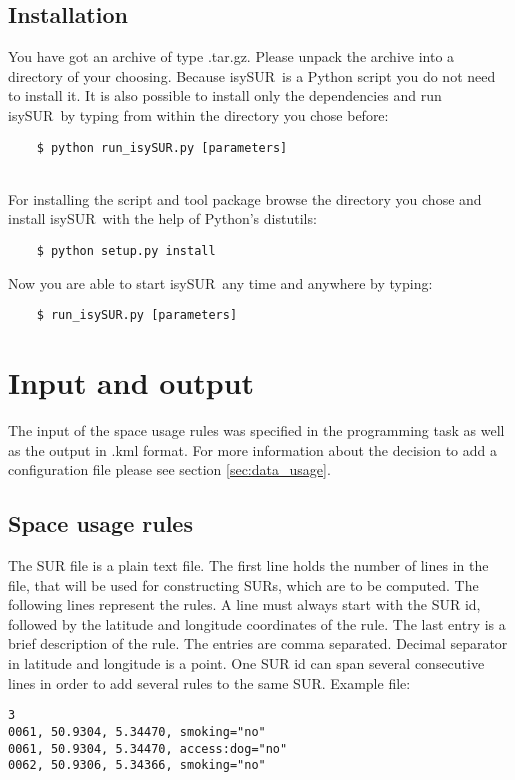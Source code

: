 \documentclass[11pt,fleqn]{book} %
\newcommand{\ProjectTitle}{isySUR}
\newcommand{\pt}{\ProjectTitle}
\begin{document}
\subsection{Installation}
You have got an archive of type .tar.gz. Please unpack the archive into a directory of your choosing. Because \pt\ is a Python script you do not need to install it. It is also possible to install only the dependencies and run \pt\ by typing from within the directory you chose before:
\begin{verbatim}
	$ python run_isySUR.py [parameters]
\end{verbatim}
~\\

For installing the script and tool package browse the directory you chose and install \pt\ with the help of Python's distutils:
\begin{verbatim}
	$ python setup.py install
\end{verbatim}
Now you are able to start \pt\ any time and anywhere by typing:
\begin{verbatim}
	$ run_isySUR.py [parameters]
\end{verbatim}

\section{Input and output}\label{sec:io}
The input of the space usage rules was specified in the programming task as well as the output in .kml format. For more information about the decision to add a configuration file please see section \ref{sec:data_usage}.

\subsection{Space usage rules}
The SUR file is a plain text file. The first line holds the number of lines in the file, that will be used for constructing SURs, which are to be computed. The following lines represent the rules. A line must always start with the SUR id, followed by the latitude and longitude coordinates of the rule. The last entry is a brief description of the rule. The entries are comma separated. Decimal separator in latitude and longitude is a point. One SUR id can span several consecutive lines in order to add several rules to the same SUR.
\newpage
Example file:
\begin{verbatim}
3
0061, 50.9304, 5.34470, smoking="no"
0061, 50.9304, 5.34470, access:dog="no"
0062, 50.9306, 5.34366, smoking="no"
\end{verbatim}
\end{document}
